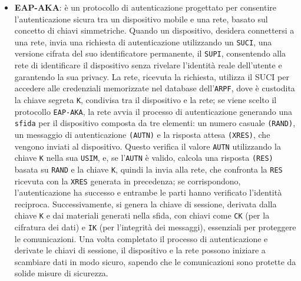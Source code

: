 \documentclass[english]{article}
\begin{document}
\begin{itemize}
	\item \textbf{\hypertarget{EAP-AKA}{EAP-AKA}}: è un protocollo di autenticazione progettato
	      per consentire l'autenticazione sicura tra un dispositivo mobile e una rete, basato
	      sul concetto di chiavi simmetriche. Quando un dispositivo, desidera connettersi a
	      una rete, invia una richiesta di autenticazione utilizzando un \texttt{SUCI},
	      una versione cifrata del suo identificatore permanente, il \texttt{SUPI}, consentendo
	      alla rete di identificare il dispositivo senza rivelare l’identità reale dell’utente
	      e garantendo la sua privacy. La rete, ricevuta la richiesta, utilizza il SUCI per
	      accedere alle credenziali memorizzate nel database dell’\texttt{ARPF}, dove è custodita
	      la chiave segreta \texttt{K}, condivisa tra il dispositivo e la rete; se viene scelto
	      il protocollo \texttt{EAP-AKA}, la rete avvia il processo di autenticazione generando
	      una \texttt{sfida} per il dispositivo composta da tre elementi: un numero casuale
	      \texttt{(RAND)}, un messaggio di autenticazione \texttt{(AUTN)} e la risposta attesa
	      \texttt{(XRES)}, che vengono inviati al dispositivo. Questo verifica il valore
	      \texttt{AUTN} utilizzando la chiave \texttt{K} nella sua \texttt{USIM}, e, se
	      l'\texttt{AUTN} è valido, calcola una risposta \texttt{(RES)} basata su \texttt{RAND}
	      e la chiave \texttt{K}, quindi la invia alla rete, che confronta la \texttt{RES}
	      ricevuta con la \texttt{XRES} generata in precedenza; se corrispondono,
	      l’autenticazione ha successo e entrambe le parti hanno verificato l'identità reciproca.
	      Successivamente, si genera la chiave di sessione, derivata dalla chiave \texttt{K}
	      e dai materiali generati nella sfida, con chiavi come \texttt{CK}
	      (per la cifratura dei dati) e \texttt{IK} (per l’integrità dei messaggi), essenziali
	      per proteggere le comunicazioni. Una volta completato il processo di autenticazione
	      e derivate le chiavi di sessione, il dispositivo e la rete possono iniziare a scambiare
	      dati in modo sicuro, sapendo che le comunicazioni sono protette
	      da solide misure di sicurezza.


\end{itemize}
\end{document}

